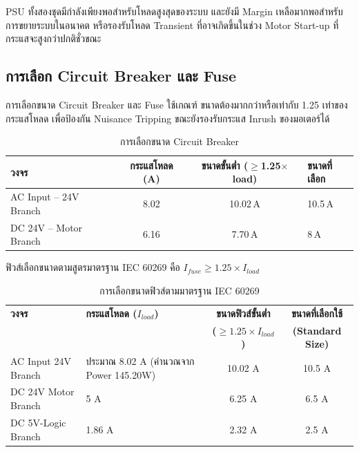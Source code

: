 PSU ทั้งสองชุดมีกำลังเพียงพอสำหรับโหลดสูงสุดของระบบ และยังมี Margin เหลือมากพอสำหรับการขยายระบบในอนาคต หรือรองรับโหลด Transient ที่อาจเกิดขึ้นในช่วง Motor Start-up ที่กระแสจะสูงกว่าปกติชั่วขณะ

\subsection{การเลือก Circuit Breaker และ Fuse}
\label{subsec:breaker_fuse}

การเลือกขนาด Circuit Breaker และ Fuse ใช้เกณฑ์
ขนาดต้องมากกว่าหรือเท่ากับ 1.25 เท่าของกระแสโหลด
เพื่อป้องกัน Nuisance Tripping
ขณะยังรองรับกระแส Inrush ของมอเตอร์ได้

\begin{table}[H]
  \centering
  \caption{การเลือกขนาด Circuit Breaker}
  \label{tab:breaker_select}
  \begin{tabular}{lccl}
    \toprule
    วงจร & กระแสโหลด (A) & ขนาดขั้นต่ำ ($\geq$1.25$\times$load) & ขนาดที่เลือก \\
    \midrule
    AC Input -- 24V Branch & 8.02 & 10.02\,A & 10.5\,A \\
    DC 24V -- Motor Branch & 6.16 & 7.70\,A & 8\,A \\
    \bottomrule
  \end{tabular}
\end{table}


ฟิวส์เลือกขนาดตามสูตรมาตรฐาน IEC 60269 คือ $I_{fuse} \ge 1.25 \times I_{load}$

\begin{table}[H]
    \centering
    \caption{การเลือกขนาดฟิวส์ตามมาตรฐาน IEC 60269}
    \label{tab:fuse_selection}
    \begin{tabular}{p{3.5cm} p{4.5cm} cc}
        \toprule
        \textbf{วงจร} & \textbf{กระแสโหลด ($I_{load}$)} & \textbf{ขนาดฟิวส์ขั้นต่ำ} & \textbf{ขนาดที่เลือกใช้} \\
         & & \textbf{($\ge 1.25 \times I_{load}$)} & \textbf{(Standard Size)} \\
        \midrule
        AC Input 24V Branch & ประมาณ 8.02 A (คำนวณจาก Power 145.20W) & 10.02 A & 10.5 A \\
        DC 24V Motor Branch & 5 A & 6.25 A & 6.5 A \\
        DC 5V-Logic Branch & 1.86 A & 2.32 A & 2.5 A \\
        \bottomrule
    \end{tabular}
\end{table}

